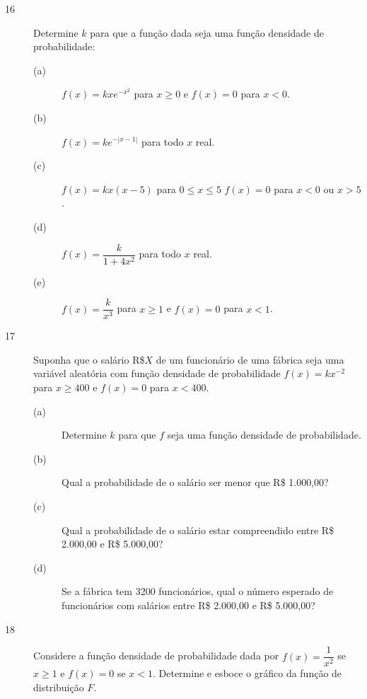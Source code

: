 \documentclass{report}
\begin{document}
\begin{description}

\item[{\large 16}] Determine $k$ para que a função dada seja uma função densidade de probabilidade:


\begin{description}

\item[(a)] $f(x)=kxe^{-x^{2}}$ para $x\geq 0$ e $f(x)=0$ para $x<0$.
\item[(b)] $f(x)=ke^{-|x-1|}$ para todo $x$ real.
\item[(c)] $f(x)=kx(x-5)$ para $0\leq x\leq 5$ $f(x)=0$ para $x<0$ ou $x>5$.
\item[(d)] $f(x)=\dfrac{k}{1+4x^{2}}$ para todo $x$ real.
\item[(e)] $f(x)=\dfrac{k}{x^{3}}$ para $x\geq 1$ e $f(x)=0$ para $x<1$.
\end{description}

\end{description}

\begin{description}

\item[{\large 17}] Suponha que o salário R\$$X$ de um funcionário de uma fábrica seja uma variável aleatória com função densidade de probabilidade $f(x)=kx^{-2}$ para $x\geq 400$ e $f(x)=0$ para $x<400$.


\begin{description}

\item[(a)] Determine $k$ para que $f$ seja uma função densidade de probabilidade.
\item[(b)] Qual a probabilidade de o salário ser menor que R\$ 1.000,00?
\item[(c)] Qual a probabilidade de o salário estar compreendido entre R\$ 2.000,00 e R\$ 5.000,00?
\item[(d)] Se a fábrica tem 3200 funcionários, qual o número esperado de funcionários com salários entre R\$ 2.000,00 e R\$ 5.000,00?
\end{description}

\end{description}

\begin{description}

\item[{\large 18}] Considere a função densidade de probabilidade dada por $f(x)=\dfrac{1}{x^{2}}$ se $x\geq 1$ e $f(x)=0$ se $x<1$. Determine e esboce o gráfico da função de distribuição $F$.

\end{description}
\end{document}
